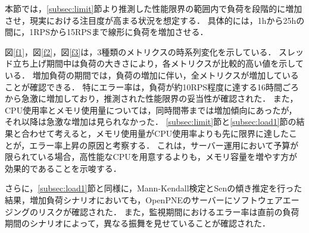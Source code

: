 \documentclass[twoside,twocolumn,10pt]{jarticle}  %
\begin{document}
本節では，\ref{subsec:limit}節より推測した性能限界の範囲内で負荷を段階的に増加させ，現実における注目度が高まる状況を想定する．
具体的には，1hから25hの間に，1RPSから15RPSまで線形に負荷を増加させる．

図\ref{f1}，図\ref{f2}，図\ref{f3}は，3種類のメトリクスの時系列変化を示している．
スレッド立ち上げ期間中は負荷の大きさにより，各メトリクスが比較的高い値を示している．
増加負荷の期間では，負荷の増加に伴い，全メトリクスが増加していることが確認できる．
特にエラー率は，負荷が約10RPS程度に達する16時間ごろから急激に増加しており，推測された性能限界の妥当性が確認された．
また，CPU使用率とメモリ使用量については，同時間帯までは増加傾向にあったが，それ以降は急激な増加は見られなかった．
\ref{subsec:limit}節と\ref{subsec:load1}節の結果と合わせて考えると，メモリ使用量がCPU使用率よりも先に限界に達したことが，エラー率上昇の原因と考察する．
これは，サーバー運用において予算が限られている場合，高性能なCPUを用意するよりも，メモリ容量を増やす方が効果的であることを示唆する．\par
さらに，\ref{subsec:load1}節と同様に，Mann-Kendall検定\cite{Mann1945Nonparametric}とSenの傾き推定\cite{Sen1968Estimates}を行った結果，増加負荷シナリオにおいても，OpenPNEのサーバーにソフトウェアエージングのリスクが確認された．
また，監視期間におけるエラー率は直前の負荷期間のシナリオによって，異なる振舞を見せていることが確認された．
\end{document}

